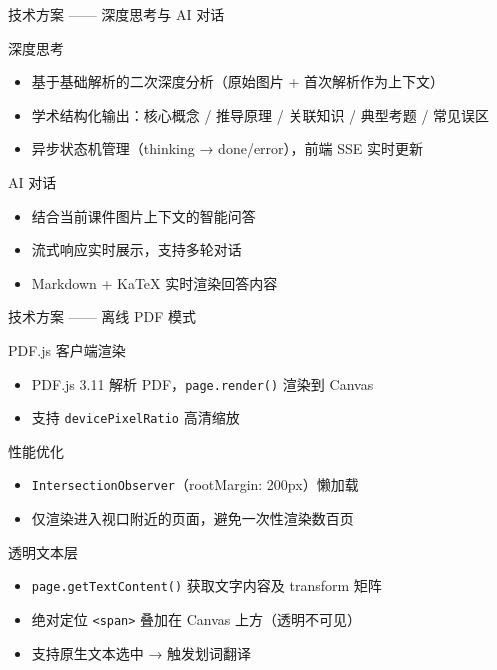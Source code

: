 \documentclass[aspectratio=169]{beamer}
\begin{document}
\begin{frame}{技术方案 —— 深度思考与 AI 对话}
  \begin{block}{深度思考}
    \begin{itemize}
      \item 基于基础解析的二次深度分析（原始图片 + 首次解析作为上下文）
      \item 学术结构化输出：核心概念 / 推导原理 / 关联知识 / 典型考题 / 常见误区
      \item 异步状态机管理（thinking → done/error），前端 SSE 实时更新
    \end{itemize}
  \end{block}

  \begin{block}{AI 对话}
    \begin{itemize}
      \item 结合当前课件图片上下文的智能问答
      \item 流式响应实时展示，支持多轮对话
      \item Markdown + KaTeX 实时渲染回答内容
    \end{itemize}
  \end{block}
\end{frame}

\begin{frame}{技术方案 —— 离线 PDF 模式}
  \begin{block}{PDF.js 客户端渲染}
    \begin{itemize}
      \item PDF.js 3.11 解析 PDF，\texttt{page.render()} 渲染到 Canvas
      \item 支持 \texttt{devicePixelRatio} 高清缩放
    \end{itemize}
  \end{block}

  \begin{block}{性能优化}
    \begin{itemize}
      \item \texttt{IntersectionObserver}（rootMargin: 200px）懒加载
      \item 仅渲染进入视口附近的页面，避免一次性渲染数百页
    \end{itemize}
  \end{block}

  \begin{block}{透明文本层}
    \begin{itemize}
      \item \texttt{page.getTextContent()} 获取文字内容及 transform 矩阵
      \item 绝对定位 \texttt{<span>} 叠加在 Canvas 上方（透明不可见）
      \item 支持原生文本选中 → 触发划词翻译
    \end{itemize}
  \end{block}
\end{frame}
\end{document}
